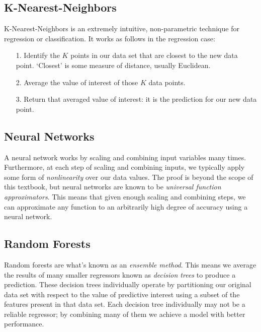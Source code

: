 \subsection{K-Nearest-Neighbors}
K-Nearest-Neighbors is an extremely intuitive, non-parametric technique for regression or classification. It works as follows in the regression case:

\begin{itemize}
    \item[1.] Identify the $K$ points in our data set that are closest to the new data point. `Closest' is some measure of distance, usually Euclidean.
    \item[2.] Average the value of interest of those $K$ data points.
    \item[3.] Return that averaged value of interest: it is the prediction for our new data point.
\end{itemize}


\subsection{Neural Networks}
A neural network works by scaling and combining input variables many times. Furthermore, at each step of scaling and combining inputs, we typically apply some form of \textit{nonlinearity} over our data values. The proof is beyond the scope of this textbook, but neural networks are known to be \textit{universal function approximators}. This means that given enough scaling and combining steps, we can approximate any function to an arbitrarily high degree of accuracy using a neural network.

\subsection{Random Forests}
Random forests are what's known as an \textit{ensemble method}. This means we average the results of many smaller regressors known as \textit{decision trees} to produce a prediction. These decision trees individually operate by partitioning our original data set with respect to the value of predictive interest using a subset of the features present in that data set. Each decision tree individually may not be a reliable regressor; by combining many of them we achieve a model with better performance.

